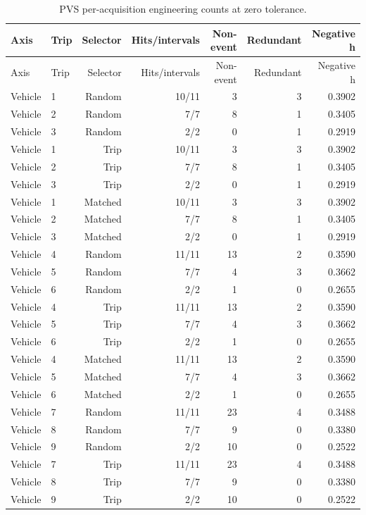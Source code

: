 \begin{singlespace}\small
\begin{longtable}{llrrrrr}
\caption{PVS per-acquisition engineering counts at zero tolerance.}\\
\toprule
Axis & Trip & Selector & Hits/intervals & Non-event & Redundant & Negative h \\
\midrule\endfirsthead
\toprule Axis & Trip & Selector & Hits/intervals & Non-event & Redundant & Negative h \\
\midrule\endhead
Vehicle & 1 & Random & 10/11 & 3 & 3 & 0.3902 \\
Vehicle & 2 & Random & 7/7 & 8 & 1 & 0.3405 \\
Vehicle & 3 & Random & 2/2 & 0 & 1 & 0.2919 \\
Vehicle & 1 & Trip & 10/11 & 3 & 3 & 0.3902 \\
Vehicle & 2 & Trip & 7/7 & 8 & 1 & 0.3405 \\
Vehicle & 3 & Trip & 2/2 & 0 & 1 & 0.2919 \\
Vehicle & 1 & Matched & 10/11 & 3 & 3 & 0.3902 \\
Vehicle & 2 & Matched & 7/7 & 8 & 1 & 0.3405 \\
Vehicle & 3 & Matched & 2/2 & 0 & 1 & 0.2919 \\
Vehicle & 4 & Random & 11/11 & 13 & 2 & 0.3590 \\
Vehicle & 5 & Random & 7/7 & 4 & 3 & 0.3662 \\
Vehicle & 6 & Random & 2/2 & 1 & 0 & 0.2655 \\
Vehicle & 4 & Trip & 11/11 & 13 & 2 & 0.3590 \\
Vehicle & 5 & Trip & 7/7 & 4 & 3 & 0.3662 \\
Vehicle & 6 & Trip & 2/2 & 1 & 0 & 0.2655 \\
Vehicle & 4 & Matched & 11/11 & 13 & 2 & 0.3590 \\
Vehicle & 5 & Matched & 7/7 & 4 & 3 & 0.3662 \\
Vehicle & 6 & Matched & 2/2 & 1 & 0 & 0.2655 \\
Vehicle & 7 & Random & 11/11 & 23 & 4 & 0.3488 \\
Vehicle & 8 & Random & 7/7 & 9 & 0 & 0.3380 \\
Vehicle & 9 & Random & 2/2 & 10 & 0 & 0.2522 \\
Vehicle & 7 & Trip & 11/11 & 23 & 4 & 0.3488 \\
Vehicle & 8 & Trip & 7/7 & 9 & 0 & 0.3380 \\
Vehicle & 9 & Trip & 2/2 & 10 & 0 & 0.2522 \\

\end{longtable}
\end{singlespace}
